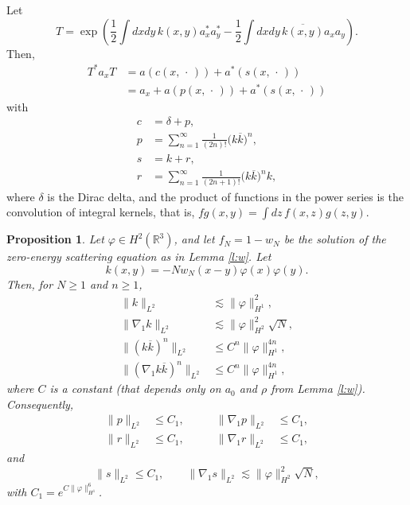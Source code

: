 \documentclass[a4paper,11pt]{article}
\newtheorem{prop}{Proposition}
\newcommand{\R}{\mathds{R}}
\begin{document}
Let
\begin{displaymath}
  T = \exp \left( \frac{1}{2} \int dxdy \, k(x,y) a_x^* a_y^* - \frac{1}{2}
  \int dxdy \, \overline{k(x,y)} a_x a_y \right).
\end{displaymath}
Then,
\begin{align*}
  T^* a_x T & = a(c(x,\,\cdot\,)) + a^*(s(x,\,\cdot\,)) \\
  & = a_x + a(p(x,\,\cdot\,)) + a^*(s(x,\,\cdot\,))
\end{align*}
with
\begin{align*}
  c & = \delta + p, \\
  p & = \sum_{n=1}^\infty \frac{1}{(2n)!} \big( k \overline{k} \big)^n, \\
  s & = k + r, \\
  r & = \sum_{n=1}^\infty \frac{1}{(2n+1)!} \big( k \overline{k} \big)^n k,
\end{align*}
where $\delta$ is the Dirac delta, and the product of functions in the power
series is the convolution of integral kernels, that is, $fg(x,y) = \int dz \,
f(x,z) g(z,y)$.


\begin{prop}
  \label{p:psr}
  Let $\varphi \in H^2(\R^3)$, and let $f_N=1-w_N$ be the solution of the
  zero-energy scattering equation as in Lemma \ref{l:w}. Let
  \begin{displaymath}
    k(x,y) = - N w_N(x-y) \varphi(x) \varphi(y).
  \end{displaymath}
  Then, for $N \ge 1$ and $n \ge 1$,
  \begin{align}
    \| k \|_{L^2} & \apprle \| \varphi \|_{H^1}^2, \label{k} \tag{i} \\
    \| \nabla_1 k \|_{L^2} & \apprle \| \varphi \|_{H^2}^2 \sqrt{N},
    \label{gradk} \tag{ii} \\
    \| (k \overline{k})^n \|_{L^2} & \le C^n \| \varphi \|_{H^1}^{4n},
    \tag{iii} \\
    \| (\nabla_1 k \overline{k})^n \|_{L^2} & \le C^n \| \varphi
    \|_{H^1}^{4n}, \tag{iv}
  \end{align}
  where $C$ is a constant (that depends only on $a_0$ and $\rho$ from Lemma
  \ref{l:w}). Consequently,
  \begin{equation}
    \begin{alignedat}{2}
      \| p \|_{L^2} & \le C_1, \qquad & \| \nabla_1 p \|_{L^2} & \le C_1, \\
      \| r \|_{L^2} & \le C_1, \qquad & \| \nabla_1 r \|_{L^2} & \le C_1,
    \end{alignedat}
    \tag{v}
  \end{equation}
  and
  \begin{equation}
    \| s \|_{L^2} \le C_1, \qquad \| \nabla_1 s \|_{L^2} \apprle \| \varphi
    \|_{H^2}^2 \sqrt{N}, \tag{vi}
  \end{equation}
  with $C_1 = e^{C \| \varphi \|_{H^1}^6}$.
\end{prop}
\end{document}
